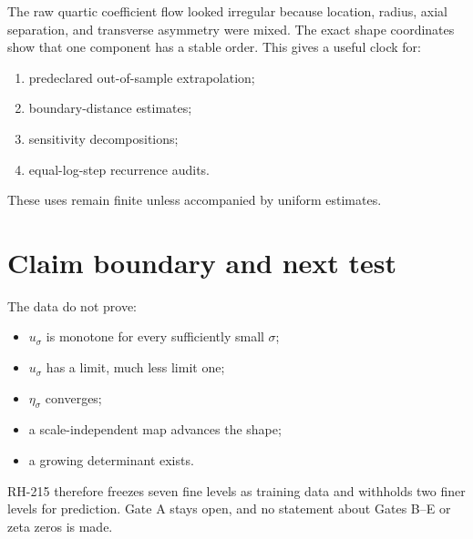 \documentclass[12pt]{article}
\theoremstyle{remark}\newtheorem{remark}[theorem]{Remark}
\begin{document}
The raw quartic coefficient flow looked irregular because location, radius,
axial separation, and transverse asymmetry were mixed.  The exact shape
coordinates show that one component has a stable order.  This gives a useful
clock for:
\begin{enumerate}[leftmargin=2em]
\item predeclared out-of-sample extrapolation;
\item boundary-distance estimates;
\item sensitivity decompositions;
\item equal-log-step recurrence audits.
\end{enumerate}
These uses remain finite unless accompanied by uniform estimates.

\section{Claim boundary and next test}

The data do not prove:
\begin{itemize}[leftmargin=2em]
\item $u_\sigma$ is monotone for every sufficiently small $\sigma$;
\item $u_\sigma$ has a limit, much less limit one;
\item $\eta_\sigma$ converges;
\item a scale-independent map advances the shape;
\item a growing determinant exists.
\end{itemize}

RH-215 therefore freezes seven fine levels as training data and withholds two
finer levels for prediction.  Gate A stays open, and no statement about
Gates B--E or zeta zeros is made.


\end{document}
